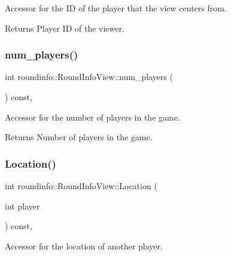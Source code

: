 Accessor for the ID of the player that the view centers from. 

\begin{DoxyReturn}{Returns}
Player ID of the viewer. 
\end{DoxyReturn}
\mbox{\label{classroundinfo_1_1_round_info_view_af4d82c9aff1c4a27cba11740f6ac76ab}} 
\subsubsection{\texorpdfstring{num\+\_\+players()}{num\_players()}}
{\footnotesize\ttfamily int roundinfo\+::\+Round\+Info\+View\+::num\+\_\+players (\begin{DoxyParamCaption}{ }\end{DoxyParamCaption}) const\hspace{0.3cm}{\ttfamily [inline]}, {\ttfamily [noexcept]}}



Accessor for the number of players in the game. 

\begin{DoxyReturn}{Returns}
Number of players in the game. 
\end{DoxyReturn}
\mbox{\label{classroundinfo_1_1_round_info_view_a05f42a982570552bbeb8c330e62437ad}} 
\subsubsection{\texorpdfstring{Location()}{Location()}}
{\footnotesize\ttfamily int roundinfo\+::\+Round\+Info\+View\+::\+Location (\begin{DoxyParamCaption}\item[{int}]{player }\end{DoxyParamCaption}) const\hspace{0.3cm}{\ttfamily [inline]}, {\ttfamily [noexcept]}}



Accessor for the location of another player. 


